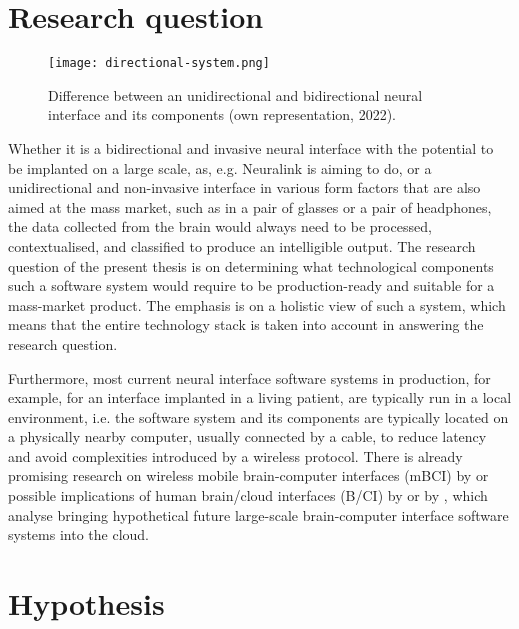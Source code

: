 \section{Research question}
\label{chapter1-research-question}

\begin{figure}[ht]
  \centering
  \texttt{[image: directional-system.png]}
  \caption{Difference between an unidirectional and bidirectional neural interface and its components (own representation, 2022).}
  \label{fig:directional-system}
\end{figure}

Whether it is a bidirectional and invasive neural interface with the potential to be implanted on a large scale, as, e.g. Neuralink is aiming to do, or a unidirectional and non-invasive interface in various form factors that are also aimed at the mass market, such as in a pair of glasses or a pair of headphones, the data collected from the brain would always need to be processed, contextualised, and classified to produce an intelligible output. The research question of the present thesis is on determining what technological components such a software system would require to be production-ready and suitable for a mass-market product. The emphasis is on a holistic view of such a system, which means that the entire technology stack is taken into account in answering the research question.

Furthermore, most current neural interface software systems in production, for example, for an interface implanted in a living patient, are typically run in a local environment, i.e. the software system and its components are typically located on a physically nearby computer, usually connected by a cable, to reduce latency and avoid complexities introduced by a wireless protocol. There is already promising research on wireless mobile brain-computer interfaces (mBCI) by \citeauthor{minguillon_mobile_2017} \citeyearpar{minguillon_mobile_2017} or possible implications of human brain/cloud interfaces (B/CI) by \citeauthor{martins_human_2019} \citeyearpar{martins_human_2019} or by \citeauthor{angelica_cognitive_2021} \citeyearpar{angelica_cognitive_2021}, which analyse bringing hypothetical future large-scale brain-computer interface software systems into the cloud.


\section{Hypothesis}
\label{chapter1-hypothesis}


